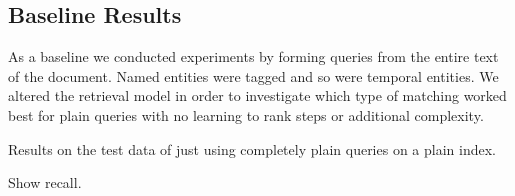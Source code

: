 \documentclass{mpaper}
\begin{document}
\subsection{Baseline Results}
As a baseline we conducted experiments by forming queries from the entire text of the document.
Named entities were tagged and so were temporal entities.
We altered the retrieval model in order to investigate which type of matching worked best for plain queries with no learning to rank steps or additional complexity.

Results on the test data of just using completely plain queries on a plain index.

Show recall.
\begin{center}
\begin{table}[h]
\centering
{}
\caption{Index with no temporal resolution or named entity recognition, using full document text as queries.}
\label{plain_index_plain_results}
\end{table}
\end{center}

\begin{center}
\begin{table}[h]
\centering
{}
\caption{Basic Textual Query Results Using Different Models}
\label{plain_results}
\end{table}
\end{center}
\end{document}
